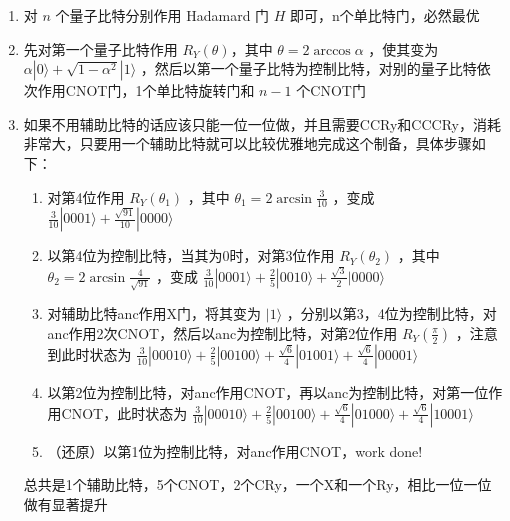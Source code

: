 \documentclass{ctexart}
\newcommand{\ket}[1]{|#1\rangle}
\begin{document}
\begin{enumerate}
    \item[(a)] 对 $n$ 个量子比特分别作用 Hadamard 门 $H$ 即可，n个单比特门，必然最优

    \item[(b)] 先对第一个量子比特作用 $R_Y(\theta)$，其中 $\theta = 2\arccos\alpha$ ，使其变为 $\alpha\ket{0} + \sqrt{1-\alpha^2}\ket{1}$ ，然后以第一个量子比特为控制比特，对别的量子比特依次作用CNOT门，1个单比特旋转门和 $n-1$ 个CNOT门

    \item[(c)] 如果不用辅助比特的话应该只能一位一位做，并且需要CCRy和CCCRy，消耗非常大，只要用一个辅助比特就可以比较优雅地完成这个制备，具体步骤如下：\begin{enumerate}
        \item[(1)] 对第4位作用 $R_Y(\theta_1)$ ，其中 $\theta_1 = 2\arcsin\frac{3}{10}$ ，变成 $\frac{3}{10}\ket{0001} + \frac{\sqrt{91}}{10}\ket{0000}$
        \item[(2)] 以第4位为控制比特，当其为0时，对第3位作用 $R_Y(\theta_2)$ ，其中 $\theta_2 = 2\arcsin\frac{4}{\sqrt{91}}$ ，变成 $\frac{3}{10}\ket{0001} + \frac{2}{5}\ket{0010} + \frac{\sqrt{3}}{2}\ket{0000}$
        \item[(3)] 对辅助比特anc作用X门，将其变为 $\ket{1}$ ，分别以第3，4位为控制比特，对anc作用2次CNOT，然后以anc为控制比特，对第2位作用 $R_Y(\frac{\pi}{2})$ ，注意到此时状态为 $\frac{3}{10}\ket{00010} + \frac{2}{5}\ket{00100} + \frac{\sqrt{6}}{4}\ket{01001} + \frac{\sqrt{6}}{4}\ket{00001}$
        \item[(4)] 以第2位为控制比特，对anc作用CNOT，再以anc为控制比特，对第一位作用CNOT，此时状态为 $\frac{3}{10}\ket{00010} + \frac{2}{5}\ket{00100} + \frac{\sqrt{6}}{4}\ket{01000} + \frac{\sqrt{6}}{4}\ket{10001}$
        \item[(5)] （还原）以第1位为控制比特，对anc作用CNOT，work done!
    \end{enumerate}
    总共是1个辅助比特，5个CNOT，2个CRy，一个X和一个Ry，相比一位一位做有显著提升


\end{enumerate}
\end{document}
